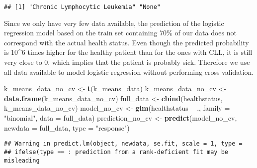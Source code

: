 \documentclass[]{article}
\newenvironment{Shaded}{\begin{snugshade}}{\end{snugshade}}
\newcommand{\KeywordTok}[1]{\textcolor[rgb]{0.13,0.29,0.53}{\textbf{#1}}}
\newcommand{\DataTypeTok}[1]{\textcolor[rgb]{0.13,0.29,0.53}{#1}}
\newcommand{\StringTok}[1]{\textcolor[rgb]{0.31,0.60,0.02}{#1}}
\newcommand{\OperatorTok}[1]{\textcolor[rgb]{0.81,0.36,0.00}{\textbf{#1}}}
\newcommand{\NormalTok}[1]{#1}
\begin{document}
\begin{Shaded}
\end{Shaded}

\begin{verbatim}
## [1] "Chronic Lymphocytic Leukemia" "None"
\end{verbatim}

Since we only have very few data available, the prediction of the
logistic regression model based on the train set containing 70\% of our
data does not correspond with the actual health status. Even though the
predicted probability is 10\^{}6 times higher for the healthy patient
than for the ones with CLL, it is still very close to 0, which implies
that the patient is probably sick. Therefore we use all data available
to model logistic regression without performing cross validation.

\begin{Shaded}
\begin{Highlighting}[]
\NormalTok{k_means_data_no_cv <-}\StringTok{ }\KeywordTok{t}\NormalTok{(k_means_data)}
\NormalTok{k_means_data_no_cv <-}\StringTok{ }\KeywordTok{data.frame}\NormalTok{(k_means_data_no_cv)}
\NormalTok{full_data <-}\StringTok{ }\KeywordTok{cbind}\NormalTok{(healthstatus, k_means_data_no_cv)}
\NormalTok{model_no_cv <-}\StringTok{ }\KeywordTok{glm}\NormalTok{(healthstatus }\OperatorTok{~}\StringTok{ }\NormalTok{., }\DataTypeTok{family =} \StringTok{"binomial"}\NormalTok{, }\DataTypeTok{data =}\NormalTok{ full_data)}
\NormalTok{prediction_no_cv <-}\StringTok{ }\KeywordTok{predict}\NormalTok{(model_no_cv, }\DataTypeTok{newdata =}\NormalTok{ full_data, }\DataTypeTok{type =} \StringTok{"response"}\NormalTok{)}
\end{Highlighting}
\end{Shaded}

\begin{verbatim}
## Warning in predict.lm(object, newdata, se.fit, scale = 1, type =
## ifelse(type == : prediction from a rank-deficient fit may be misleading
\end{verbatim}

\begin{Shaded}
\end{Shaded}
\end{document}
